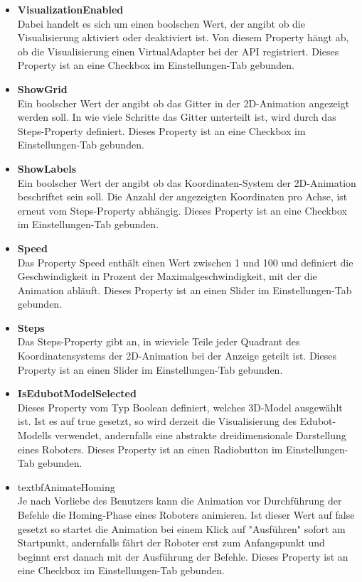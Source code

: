 \begin{itemize}
\item \textbf{VisualizationEnabled}\\
Dabei handelt es sich um einen boolschen Wert, der angibt ob die Visualisierung aktiviert oder deaktiviert ist. Von diesem Property hängt ab, ob die Visualisierung einen VirtualAdapter bei der API registriert. Dieses Property ist an eine Checkbox im Einstellungen-Tab gebunden.
\item \textbf{ShowGrid}\\
Ein boolscher Wert der angibt ob das Gitter in der 2D-Animation angezeigt werden soll. In wie viele Schritte das Gitter unterteilt ist, wird durch das Steps-Property definiert. Dieses Property ist an eine Checkbox im Einstellungen-Tab gebunden.
\item \textbf{ShowLabels}\\
Ein boolscher Wert der angibt ob das Koordinaten-System der 2D-Animation beschriftet sein soll. Die Anzahl der angezeigten Koordinaten pro Achse, ist erneut vom Steps-Property abhängig. Dieses Property ist an eine Checkbox im Einstellungen-Tab gebunden.
\item \textbf{Speed}\\
Das Property Speed enthält einen Wert zwischen 1 und 100 und definiert die Geschwindigkeit in Prozent der Maximalgeschwindigkeit, mit der die Animation abläuft. Dieses Property ist an einen Slider im Einstellungen-Tab gebunden.
\item \textbf{Steps}\\
Das Steps-Property gibt an, in wieviele Teile jeder Quadrant des Koordinatensystems der 2D-Animation bei der Anzeige geteilt ist. Dieses Property ist an einen Slider im Einstellungen-Tab gebunden.
\item \textbf{IsEdubotModelSelected}\\
Dieses Property vom Typ Boolean definiert, welches 3D-Model ausgewählt ist. Ist es auf true gesetzt, so wird derzeit die Visualisierung des Edubot-Modells verwendet, andernfalls eine abstrakte dreidimensionale Darstellung eines Roboters. Dieses Property ist an einen Radiobutton im Einstellungen-Tab gebunden.
\item textbf{AnimateHoming}\\
Je nach Vorliebe des Benutzers kann die Animation vor Durchführung der Befehle die Homing-Phase eines Roboters animieren. Ist dieser Wert auf false gesetzt so startet die Animation bei einem Klick auf "Ausführen" sofort am Startpunkt, andernfalls fährt der Roboter erst zum Anfangspunkt und beginnt erst danach mit der Ausführung der Befehle. Dieses Property ist an eine Checkbox im Einstellungen-Tab gebunden.
\end{itemize}
